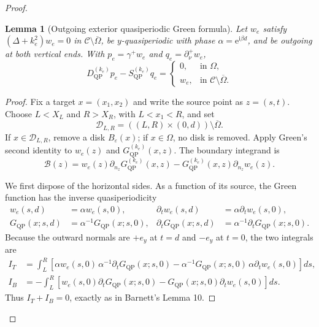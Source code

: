 \documentclass[11pt]{article}
\newcommand{\C}{\mathcal C}
\newcommand{\Om}{\Omega}
\newcommand{\ii}{\mathrm i}
\newcommand{\ee}{\mathrm e}
\newcommand{\QP}{\mathrm{QP}}
\theoremstyle{plain}
\newtheorem{lemma}[theorem]{Lemma}
\theoremstyle{definition}
\theoremstyle{remark}
\begin{document}
\begin{proof}
\begin{lemma}[Outgoing exterior quasiperiodic Green formula]
\label{lem:qp-green-exterior}
Let \(w_e\) satisfy \((\Delta+k_e^2)w_e=0\) in
\(\C\setminus\overline\Om\), be \(y\)-quasiperiodic with phase
\(\alpha=\ee^{\ii\beta d}\), and be outgoing at both vertical ends.  With
\(p_e=\gamma^+w_e\) and \(q_e=\partial_\nu^+w_e\),
\begin{equation}
D_{\QP}^{(k_e)}p_e-S_{\QP}^{(k_e)}q_e
=\begin{cases}
0,&\text{in }\Om,\\
w_e,&\text{in }\C\setminus\overline\Om.
\end{cases}
\label{eq:green-we}
\end{equation}
\end{lemma}

\begin{proof}
Fix a target \(x=(x_1,x_2)\) and write the source point as \(z=(s,t)\).
Choose \(L<X_L\) and \(R>X_R\), with \(L<x_1<R\), and set
\[
\mathcal D_{L,R}=((L,R)\times(0,d))\setminus\overline\Om.
\]
If \(x\in\mathcal D_{L,R}\), remove a disk \(B_\varepsilon(x)\); if
\(x\in\Om\), no disk is removed.  Apply Green's second identity to
\(w_e(z)\) and \(G_{\QP}^{(k_e)}(x,z)\).  The boundary integrand is
\[
\mathcal B(z)
=w_e(z)\partial_{n_z}G_{\QP}^{(k_e)}(x,z)
 -G_{\QP}^{(k_e)}(x,z)\partial_{n_z}w_e(z).
\]

We first dispose of the horizontal sides.  As a function of its source,
the Green function has the inverse quasiperiodicity
\[
\begin{aligned}
w_e(s,d)&=\alpha w_e(s,0),
&\partial_t w_e(s,d)&=\alpha\partial_t w_e(s,0),\\
G_{\QP}(x;s,d)&=\alpha^{-1}G_{\QP}(x;s,0),
&\partial_tG_{\QP}(x;s,d)&=\alpha^{-1}\partial_tG_{\QP}(x;s,0).
\end{aligned}
\]
Because the outward normals are \(+e_y\) at \(t=d\) and \(-e_y\) at
\(t=0\), the two integrals are
\[
\begin{aligned}
I_T
&=\int_L^R\left[
 \alpha w_e(s,0)\,\alpha^{-1}\partial_tG_{\QP}(x;s,0)
 -\alpha^{-1}G_{\QP}(x;s,0)\,\alpha\partial_tw_e(s,0)
 \right]ds,\\
I_B
&=-\int_L^R\left[
 w_e(s,0)\partial_tG_{\QP}(x;s,0)
 -G_{\QP}(x;s,0)\partial_tw_e(s,0)
 \right]ds.
\end{aligned}
\]
Thus \(I_T+I_B=0\), exactly as in Barnett's Lemma 10.


\end{proof}
\end{proof}
\end{document}
